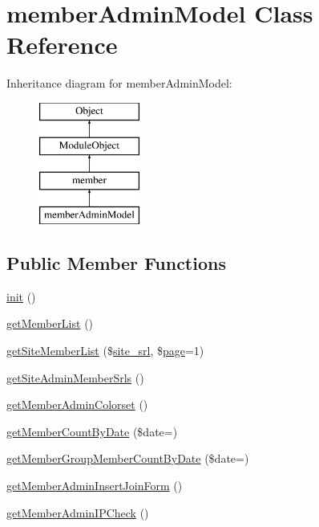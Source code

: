 \hypertarget{classmemberAdminModel}{}\section{member\+Admin\+Model Class Reference}
\label{classmemberAdminModel}
Inheritance diagram for member\+Admin\+Model\+:\begin{figure}[H]
\begin{center}
\leavevmode
\includegraphics[height=4.000000cm]{classmemberAdminModel}
\end{center}
\end{figure}
\subsection*{Public Member Functions}
\begin{DoxyCompactItemize}
\item 
\hyperlink{classmemberAdminModel_a1d4a66fe65aa6670528bddb2c225b9d7}{init} ()
\item 
\hyperlink{classmemberAdminModel_add5844ac2ed9170897363464c759f94f}{get\+Member\+List} ()
\item 
\hyperlink{classmemberAdminModel_a08479489902bfe0940023bc91ee02184}{get\+Site\+Member\+List} (\$\hyperlink{ko_8install_8php_a8b1406b4ad1048041558dce6bfe89004}{site\+\_\+srl}, \$\hyperlink{classpage}{page}=1)
\item 
\hyperlink{classmemberAdminModel_a2ae855f2db9aa8c5fc821a2de9d766e9}{get\+Site\+Admin\+Member\+Srls} ()
\item 
\hyperlink{classmemberAdminModel_a3f52ba31859fdc224dd0ac50495e450c}{get\+Member\+Admin\+Colorset} ()
\item 
\hyperlink{classmemberAdminModel_a53e4d56d174b1a188878a8adeba2c37f}{get\+Member\+Count\+By\+Date} (\$date=\textquotesingle{}\textquotesingle{})
\item 
\hyperlink{classmemberAdminModel_a9c6795c459c9657539e2f09b36339522}{get\+Member\+Group\+Member\+Count\+By\+Date} (\$date=\textquotesingle{}\textquotesingle{})
\item 
\hyperlink{classmemberAdminModel_a5cd67d34e825a2afa0fb871bd10aadb9}{get\+Member\+Admin\+Insert\+Join\+Form} ()
\item 
\hyperlink{classmemberAdminModel_a26f6b31630804f56a79156f59c0f7603}{get\+Member\+Admin\+I\+P\+Check} ()
\end{DoxyCompactItemize}
